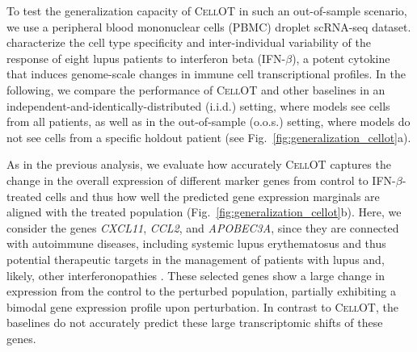 To test the generalization capacity of \textsc{CellOT} in such an out-of-sample scenario, we use a peripheral blood mononuclear cells (PBMC) droplet scRNA-seq dataset. \citet{kang2018multiplexed} characterize the cell type specificity and inter-individual variability of the response of eight lupus patients to interferon beta (IFN-$\beta$), a potent cytokine that induces genome-scale changes in immune cell transcriptional profiles. 
In the following, we compare the performance of \textsc{CellOT} and other baselines in an independent-and-identically-distributed (i.i.d.) setting, where models see cells from all patients, as well as in the out-of-sample (o.o.s.) setting, where models do not see cells from a specific holdout patient (see Fig.~\ref{fig:generalization_cellot}a).

As in the previous analysis, we evaluate how accurately \textsc{CellOT} captures the change in the overall expression of different marker genes from control to IFN-$\beta$-treated cells and thus how well the predicted gene expression marginals are aligned with the treated population (Fig.~\ref{fig:generalization_cellot}b). Here, we consider the genes \textit{CXCL11}, \textit{CCL2}, and \textit{APOBEC3A},
since they are connected with autoimmune diseases, including systemic lupus erythematosus \citep{hedrich2011epigenetic, perez2021sustained}
and thus potential therapeutic targets
in the management of patients with lupus and, likely, other interferonopathies \citep{mathian2015targeting,rani1996characterization,hedrich2011epigenetic,mathian2015targeting,perez2021sustained,flier2001differential}.
These selected genes show a large change in expression from the control to the perturbed population, partially exhibiting a bimodal gene expression profile upon perturbation. In contrast to \textsc{CellOT}, the baselines do not accurately predict these large transcriptomic shifts of these genes.


